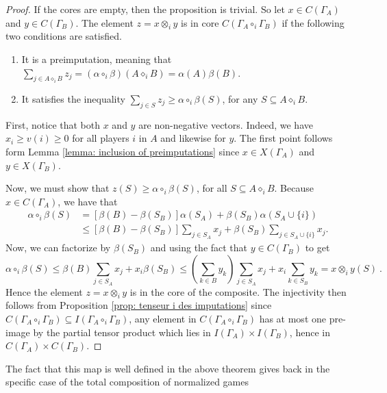 \documentclass[a4paper,12pt]{amsart}
\begin{document}
\begin{proof}
If the cores are empty, then the proposition is trivial. So let $x \in C(\Gamma_A)$ and $y \in C(\Gamma_B)$. The element $z= x \otimes_i y$ is in core $C(\Gamma_A \circ_i \Gamma_B)$ if the following two conditions are satisfied.
\begin{enumerate}
    \item It is a preimputation, meaning that \(\sum_{j \in A \diamond_i B} z_j = (\alpha \circ_i \beta)(A \diamond_i B) = \alpha(A)\beta(B)\).
    
    \item It satisfies the inequality \(\sum_{j \in S} z_j \geq \alpha \circ_i \beta(S)\), for any $S \subseteq A \diamond_i B$. 
\end{enumerate}

First, notice that both $x$ and $y$ are non-negative vectors. Indeed, we have $x_i \geq v(i) \geq 0$ for all players $i$ in $A$ and likewise for $y$. The first point follows form Lemma \ref{lemma: inclusion of preimputations} since $x \in X(\Gamma_A)$ and $y \in X(\Gamma_B).$

\medskip

Now, we must show that \(z(S) \geq \alpha \circ_i \beta(S)\), for all \(S \subseteq A \diamond_i B\). Because \(x \in C(\Gamma_A)\), we have that
\[
\begin{aligned}
\alpha \circ_i \beta(S) & = \left[ \beta(B) - \beta(S_B) \right] \alpha(S_A) + \beta(S_B) \alpha(S_A \cup \{i\}) \\
& \leq \left[ \beta(B) - \beta(S_B) \right] \sum_{j \in S_A} x_j + \beta(S_B) \sum_{j \in S_A \cup \{i\}} x_j.
\end{aligned} \]
Now, we can factorize by \(\beta(S_B)\) and using the fact that \(y \in C(\Gamma_B)\) to get
\[
\alpha \circ_i \beta(S) \leq \beta(B) \sum_{j \in S_A} x_j + x_i \beta(S_B) \leq \left(\sum_{k \in B} y_k \right) \sum_{j \in S_A} x_j + x_i \sum_{k \in S_B} y_k = x \otimes_i y(S)~.
\]
Hence the element $z= x \otimes_i y$ is in the core of the composite. The injectivity then follows from Proposition \ref{prop: tenseur i des imputations} since $C(\Gamma_A \circ_i \Gamma_B) \subseteq I(\Gamma_A \circ_i \Gamma_B)$, any element in $C(\Gamma_A \circ_i \Gamma_B)$ has at most one pre-image by the partial tensor product which lies in $I(\Gamma_A) \times I(\Gamma_B)$, hence in $C(\Gamma_A) \times C(\Gamma_B).$
\end{proof}

\begin{remark}
    The fact that this map is well defined in the above theorem gives back \cite[Theorem 4]{OwenTensor} in the specific case of the total composition of normalized games
\end{remark}
\end{document}

